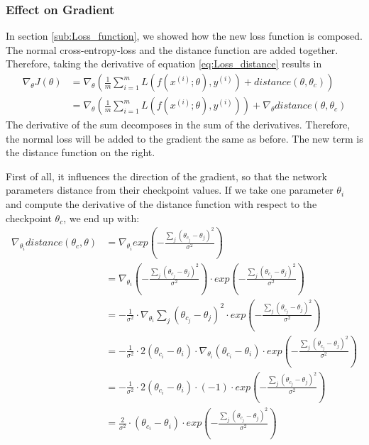 \subsubsection{Effect on Gradient}\label{sub:Effect_on_Gradient} 
In section \ref{sub:Loss_function}, we showed how the new loss function is
composed. The normal cross-entropy-loss and the distance function are added
together. Therefore, taking the derivative of equation \ref{eq:Loss_distance}
results in 
\begin{align}
    \nabla_\theta J(\theta) 
    &= \nabla_\theta (\frac{1}{m} \sum_{i=1}^m L(f(x^{(i)}; \theta), y^{(i)}) + distance(\theta, \theta_c))\\
    &= \nabla_\theta (\frac{1}{m} \sum_{i=1}^m L(f(x^{(i)}; \theta), y^{(i)})) + \nabla_\theta distance(\theta, \theta_c)
\end{align}
The derivative of the sum decomposes in the sum of the derivatives. Therefore,
the normal loss will be added to the gradient the same as before. The new
term is the distance function on the right.

First of all, it influences the direction of the gradient, so that the network
parameters distance from their checkpoint values. If we take one parameter
$\theta_i$ and compute the derivative of the distance function with respect to
the checkpoint $\theta_c$, we end up with:
\begin{align}
    \nabla_{\theta_i} distance(\theta_c, \theta)
    &= \nabla_{\theta_i} exp(-\frac{\sum_j (\theta_{c_j}-\theta_{j})^2}{\sigma^2}) \\
    &= \nabla_{\theta_i} (-\frac{\sum_j (\theta_{c_j}-\theta_{j})^2}{\sigma^2}) \cdot exp(-\frac{\sum_j (\theta_{c_j}-\theta_{j})^2}{\sigma^2}) \\
    &= -\frac{1}{\sigma^2} \cdot \nabla_{\theta_i} \sum_j (\theta_{c_j}-\theta_{j})^2 \cdot exp(-\frac{\sum_j (\theta_{c_j}-\theta_{j})^2}{\sigma^2}) \\
    &= -\frac{1}{\sigma^2} \cdot 2 (\theta_{c_i} - \theta_i) \cdot \nabla_{\theta_i}(\theta_{c_i} - \theta_i) \cdot exp(-\frac{\sum_j (\theta_{c_j}-\theta_{j})^2}{\sigma^2}) \\
    &= -\frac{1}{\sigma^2} \cdot 2 (\theta_{c_i} - \theta_i) \cdot (-1) \cdot exp(-\frac{\sum_j (\theta_{c_j}-\theta_{j})^2}{\sigma^2}) \\
    &= \frac{2}{\sigma^2} \cdot (\theta_{c_i} - \theta_i) \cdot exp(-\frac{\sum_j (\theta_{c_j}-\theta_{j})^2}{\sigma^2}) 
\end{align}

